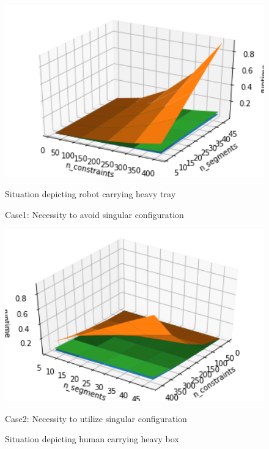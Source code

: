 \begin{figure}[h!]
	\centering
	\begin{minipage}{0.45\textwidth}
		\centering
		\includegraphics[width=1.0\textwidth]{images/plot3d1} %
		\caption{Situation depicting robot carrying heavy tray \cite{robottray}}
		{Case1: Necessity to avoid singular configuration}
	\end{minipage}\hfill
	\begin{minipage}{0.45\textwidth}
		\centering
		\includegraphics[width=1.0\textwidth]{images/plot3d2} %
		\caption{Situation depicting human carrying heavy box \cite{mot1}}
		{Case2: Necessity to utilize singular configuration}
	\end{minipage}
\end{figure}
%


